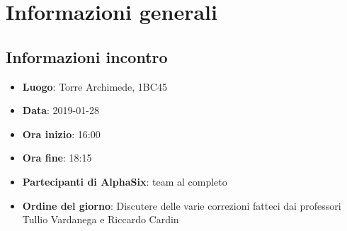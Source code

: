 \newcommand{\documento}{\VI}
\newcommand{\nomedocumentofisico}{VI\_2019-01-28.pdf}
\newcommand{\redazione}{\SG}
\newcommand{\verifica}{\NC}
\newcommand{\approvazione}{\LC}
\newcommand{\versione}{1.0.0}
\newcommand{\uso}{Interno}
\newcommand{\destinateTo}{\gruppo}
\newcommand{\datacreazione}{01 febbraio 2019}
\newcommand{\datamodifica}{03 febbraio 2019}
\newcommand{\stato}{Approvato}

\def\TABELLE{false}	%
\def\FIGURE{false} 	%






    

    	
    
    \section{Informazioni generali}
		\subsection{Informazioni incontro}
			\begin{itemize}
				\item { \textbf{Luogo}: Torre Archimede, 1BC45}
				\item {\textbf{Data}: 2019-01-28}
				\item {\textbf{Ora inizio}: 16:00}
				\item {\textbf{Ora fine}: 18:15}
				\item {\textbf{Partecipanti di AlphaSix}: team al completo}
				\item {\textbf{Ordine del giorno}: Discutere delle varie correzioni fatteci dai professori Tullio Vardanega e Riccardo Cardin}
			\end{itemize}

